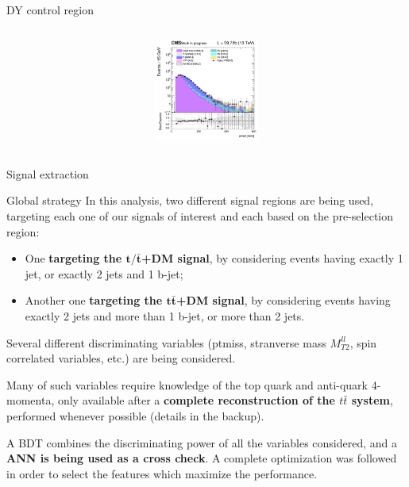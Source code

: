\documentclass[8pt]{beamer}
\begin{document}
\begin{frame}{DY control region}
\begin{columns}
\begin{column}{0.33\textwidth}
\begin{center}
     			\includegraphics[width=1.0\textwidth, height=95pt]{figs/2018/log_cratio_dyCR_ll_METcorrected_pt.png}
    		\end{center}		
		\end{column}
\end{columns} \vfill

\end{frame}












\begin{frame}[standout]
Signal extraction
\end{frame}

\begin{frame}{Global strategy}
\justifying
In this analysis, \alert{two different signal regions} are being used, targeting each one of our signals of interest and each based on the pre-selection region:
\begin{itemize}
\item One \textbf{targeting the $\bm{t/\bar t}$+DM signal}, by considering events having exactly 1 jet, or exactly 2 jets and 1 b-jet;
\item Another one \textbf{targeting the $\bm{t \bar t}$+DM signal}, by considering events having exactly 2 jets and more than 1 b-jet, or more than 2 jets.
\end{itemize} \vfill

\alert{Several different discriminating variables} (ptmiss, stranverse mass $M_{T2}^{ll}$, spin correlated variables, etc.) are being considered. \vfill

Many of such variables require knowledge of the top quark and anti-quark 4-momenta, only available after a \textbf{complete reconstruction of the $t \bar t$ system}, performed whenever possible (details in the backup). \vfill

A \alert{BDT combines the discriminating power} of all the variables considered, and a \textbf{ANN is being used as a cross check}. A complete optimization was followed in order to select the features which maximize the performance. \vfill
\end{frame}
\end{document}
